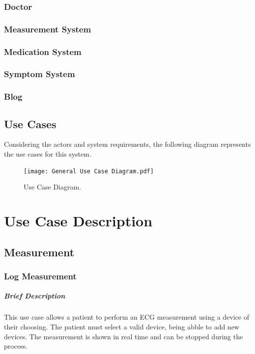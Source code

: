 \documentclass{report}
\begin{document}
\subsection{Doctor}
\subsection{Measurement System}
\subsection{Medication System}
\subsection{Symptom System}
\subsection{Blog}

\clearpage
\section{Use Cases}
Considering the actors and system requirements, the following diagram represents the use cases for this system.

\begin{figure}[hb]
    \centering
    \texttt{[image: General Use Case Diagram.pdf]}
    \caption{Use Case Diagram.}
    \label{fig:Use Case}
\end{figure}

\chapter{Use Case Description}
\vspace{-3em}
\section{Measurement}
\subsection{Log Measurement}
\vspace{-1em}
\paragraph{Brief Description}
This use case allows a patient to perform an ECG measurement using a device of their choosing. 
The patient must select a valid device, being abble to add new devices.
The measurement is shown in real time and can be stopped during the process.
\end{document}
